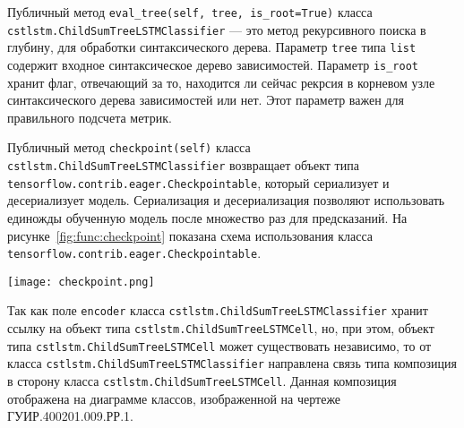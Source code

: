 Публичный метод \texttt{eval\_tree(self, tree, is\_root=True)} класса \texttt{cst\-lstm.ChildSumTreeLSTMClassifier} --- это метод рекурсивного поиска в глубину, для обработки синтаксического дерева. Параметр \texttt{tree} типа \texttt{list} содержит входное синтаксическое дерево зависимостей. Параметр \texttt{is\_root} хранит флаг, отвечающий за то, находится ли сейчас рекрсия в корневом узле синтаксического дерева зависимостей или нет. Этот параметр важен для правильного подсчета метрик.

Публичный метод \texttt{checkpoint(self)} класса \texttt{cstlstm.ChildSumTree\-LSTMClassifier} возвращает объект типа \texttt{tensorflow.contrib.eager.Che\-ckpointable}, который сериализует и десериализует модель. Сериализация и десериализация позволяют использовать единожды обученную модель после множество раз для предсказаний. На рисунке~\ref{fig:func:checkpoint} показана схема использования класса \texttt{tensorflow.contrib.eager.Checkpointable}.

\begin{center}
  \texttt{[image: checkpoint.png]}
  \label{fig:func:checkpoint}
\end{center}

Так как поле \texttt{encoder} класса \texttt{cstlstm.ChildSumTreeLSTMClassifier} хранит ссылку на объект типа \texttt{cstlstm.ChildSumTreeLSTMCell}, но, при этом, объект типа \texttt{cstlstm.ChildSumTreeLSTMCell} может существовать независимо, то от класса \texttt{cstlstm.ChildSumTreeLSTMClassifier} направлена связь типа композиция в сторону класса \texttt{cstlstm.ChildSumTreeLSTMCell}. Данная композиция отображена на диаграмме классов, изображенной на чертеже ГУИР.400201.009.РР.1.

